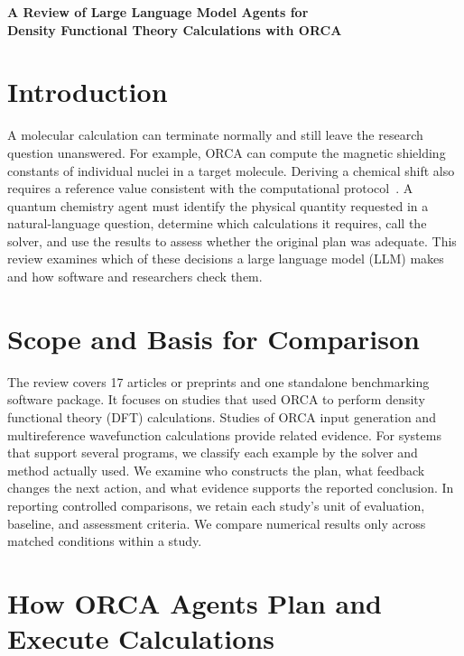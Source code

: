 \documentclass[a4paper,11pt]{article}
\begin{document}
\thispagestyle{plain}
\begin{center}
  {\LARGE\bfseries A Review of Large Language Model Agents for\\[.3ex]
   Density Functional Theory Calculations with ORCA\par}
\end{center}

\section{Introduction}
A molecular calculation can terminate normally and still leave the research
question unanswered.
For example, ORCA can compute the magnetic shielding constants of individual
nuclei in a target molecule.
Deriving a chemical shift also requires a reference value consistent with the
computational protocol~\cite{quntur}.
A quantum chemistry agent must identify the physical quantity requested in a
natural-language question, determine which calculations it requires, call the
solver, and use the results to assess whether the original plan was adequate.
This review examines which of these decisions a large language model (LLM)
makes and how software and researchers check them.

\section{Scope and Basis for Comparison}
The review covers 17 articles or preprints and one standalone benchmarking
software package.
It focuses on studies that used ORCA to perform density functional theory
(DFT) calculations.
Studies of ORCA input generation and multireference wavefunction calculations
provide related evidence.
For systems that support several programs, we classify each example by the
solver and method actually used.
We examine who constructs the plan, what feedback changes the next action,
and what evidence supports the reported conclusion.
In reporting controlled comparisons, we retain each study's unit of evaluation,
baseline, and assessment criteria.
We compare numerical results only across matched conditions within a study.

\section{How ORCA Agents Plan and Execute Calculations}
\end{document}
